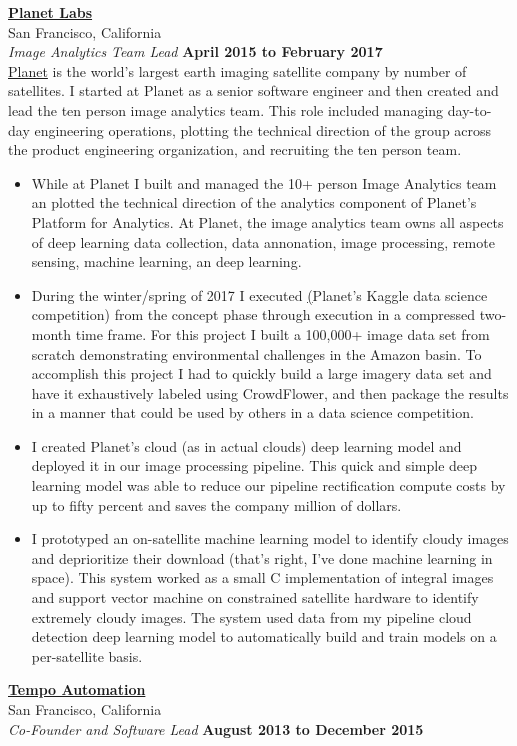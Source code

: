 \documentclass[10pt]{article}
\newenvironment{outerlist}[1][\enskip\textbullet]%
        {\begin{itemize}[#1]}{\end{itemize}%
         \vspace{-.6\baselineskip}}
\newcommand{\blankline}{\quad\pagebreak[2]}
\begin{document}
\href{http://www.planet.com/}{\textbf{Planet Labs}} \\
San Francisco, California \\
\textit{Image Analytics Team Lead}%
        \hfill \textbf{April 2015 to February 2017}  \\

\blankline
\newline
\href{http://www.planet.com}{Planet} is the world's largest earth imaging satellite company by number of satellites. I started at Planet as a senior software engineer and then created and lead the ten person image analytics team. This role included managing day-to-day engineering operations, plotting the technical direction of the group across the product engineering organization, and recruiting the ten person team. 
\\
\begin{outerlist}
\item While at Planet I built and managed the 10+ person Image Analytics team an plotted the technical direction of the analytics component of Planet's Platform for Analytics. At Planet, the image analytics team owns all aspects of deep learning data collection, data annonation, image processing, remote sensing, machine learning, an deep learning.  
\item During the winter/spring of 2017 I executed \href{https://www.kaggle.com/c/planet-understanding-the-amazon-from-space}(Planet's Kaggle data science competition) from the concept phase through execution in a compressed two-month time frame. For this project I built a 100,000+ image data set from scratch demonstrating environmental challenges in the Amazon basin. To accomplish this project I had to quickly build a large imagery data set and have it exhaustively labeled using CrowdFlower, and then package the results in a manner that could be used by others in a data science competition.   
\item I created Planet's cloud (as in actual clouds) deep learning model and deployed it in our image processing pipeline. This quick and simple deep learning model was able to reduce our pipeline rectification compute costs by up to fifty percent and saves the company million of dollars. 
\item I prototyped an on-satellite machine learning model to identify cloudy images and deprioritize their download (that's right, I've done machine learning in space). This system worked as a small C implementation of integral images and support vector machine on constrained satellite hardware to identify extremely cloudy images. The system used data from my pipeline cloud detection deep learning model to automatically build and train models on a per-satellite basis.   
\end{outerlist}
\blankline
\newline
\href{http://www.tempoautomation.com/}{\textbf{Tempo Automation}} \\
San Francisco, California \\
\textit{Co-Founder and Software Lead}%
        \hfill \textbf{August 2013 to December 2015}  \\
\end{document}
